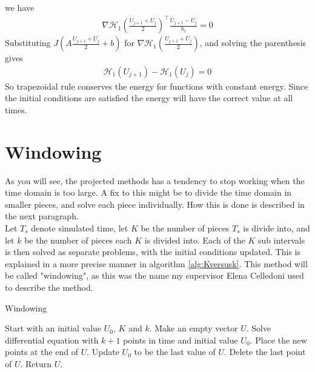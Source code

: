 we have
\begin{equation*}
\begin{aligned}
\nabla \mathcal{H}_1 (\frac{U_{j+1}  + U_j}{2}) ^\top \frac{U_{j+1} - U_j}{ h_t } = 0
\end{aligned}
\end{equation*}
Substituting $ J (A\frac{U_{j+1}  + U_j}{2}  + b) $ for $\nabla \mathcal{H}_1 (\frac{U_{j+1}  + U_j}{2})$, and solving the parenthesis gives
\begin{equation*}
\begin{aligned}
\mathcal{H}_1(U_{j+1}) - \mathcal{H}_1(U_{j}) = 0
\end{aligned}
\end{equation*}
So trapezoidal rule conserves the energy for functions with constant energy. Since the initial conditions are satisfied the energy will have the correct value at all times.

\section{Windowing}%
As you will see, the projected methods has a tendency to stop working when the time domain is too large. A fix to this might be to divide the time domain in smaller pieces, and solve each piece individually. How this is done is described in the next paragraph.\\ 

Let $T_s$ denote simulated time, let $K$ be the number of pieces $T_s$ is divide into, and let $k$ be the number of pieces each $K$ is divided into. Each of the $K$ sub intervals is then solved as separate problems, with the initial conditions updated. This is explained in a more precise manner in algorithm \ref{alg:Kversusk}. This method will be called "windowing", as this was the name my supervisor Elena Celledoni \cite{elenaperson} used to describe the method.

\begin{algorithm} [h!]
\begin{algorithmic} \caption{ Windowing } \label{alg:Kversusk}  
\STATE Start with an initial value $U_0$, $K$ and $k$.
\STATE Make an empty vector $U$.
   \STATE Solve differential equation with $k+1$ points in time and initial value $U_0$.
   \STATE Place the new points at the end of $U$.
   \STATE Update $U_0$ to be the last value of $U$.
   \STATE Delete the last point of $U$.
\ENDFOR
\STATE Return $U$.
\end{algorithmic} 
\end{algorithm}

